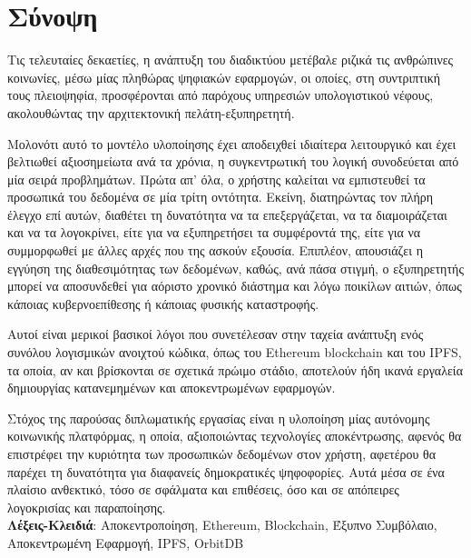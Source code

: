 \chapter*{Σύνοψη}
Τις τελευταίες δεκαετίες, η ανάπτυξη του διαδικτύου μετέβαλε ριζικά τις ανθρώπινες
κοινωνίες, μέσω μίας πληθώρας ψηφιακών εφαρμογών, οι οποίες, στη συντριπτική τους πλειοψηφία, προσφέρονται από παρόχους υπηρεσιών υπολογιστικού νέφους, ακολουθώντας την αρχιτεκτονική πελάτη-εξυπηρετητή.

Μολονότι αυτό το μοντέλο υλοποίησης έχει αποδειχθεί ιδιαίτερα λειτουργικό και έχει βελτιωθεί αξιοσημείωτα ανά τα χρόνια, η συγκεντρωτική του λογική συνοδεύεται από μία σειρά προβλημάτων. Πρώτα απ' όλα, ο χρήστης καλείται να εμπιστευθεί τα προσωπικά του δεδομένα σε μία τρίτη οντότητα. Εκείνη, διατηρώντας τον πλήρη έλεγχο επί αυτών, διαθέτει τη δυνατότητα να τα επεξεργάζεται, να τα διαμοιράζεται και να τα λογοκρίνει, είτε για να εξυπηρετήσει τα συμφέροντά της, είτε για να συμμορφωθεί με άλλες αρχές που της ασκούν εξουσία. Επιπλέον, απουσιάζει η εγγύηση της διαθεσιμότητας των δεδομένων, καθώς, ανά πάσα στιγμή, ο εξυπηρετητής μπορεί να αποσυνδεθεί για αόριστο χρονικό διάστημα και λόγω ποικίλων αιτιών, όπως κάποιας κυβερνοεπίθεσης ή κάποιας φυσικής καταστροφής.

Αυτοί είναι μερικοί βασικοί λόγοι που συνετέλεσαν στην ταχεία ανάπτυξη ενός συνόλου λογισμικών ανοιχτού κώδικα, όπως του Ethereum blockchain και του IPFS, τα οποία, αν και βρίσκονται σε σχετικά πρώιμο στάδιο, αποτελούν ήδη ικανά εργαλεία δημιουργίας κατανεμημένων και αποκεντρωμένων εφαρμογών.

Στόχος της παρούσας διπλωματικής εργασίας είναι η υλοποίηση μίας αυτόνομης κοινωνικής πλατφόρμας,
η οποία, αξιοποιώντας τεχνολογίες αποκέντρωσης, αφενός θα επιστρέφει την κυριότητα των προσωπικών
δεδομένων στον χρήστη, αφετέρου θα παρέχει τη δυνατότητα για διαφανείς δημοκρατικές ψηφοφορίες. Αυτά μέσα σε ένα πλαίσιο ανθεκτικό, τόσο σε σφάλματα και επιθέσεις, όσο και σε απόπειρες λογοκρισίας και παραποίησης.
\\[2\baselineskip]
\textbf{Λέξεις-Κλειδιά}: Αποκεντροποίηση, Ethereum, Blockchain, Έξυπνο Συμβόλαιο, Αποκεντρωμένη Εφαρμογή, IPFS, OrbitDB